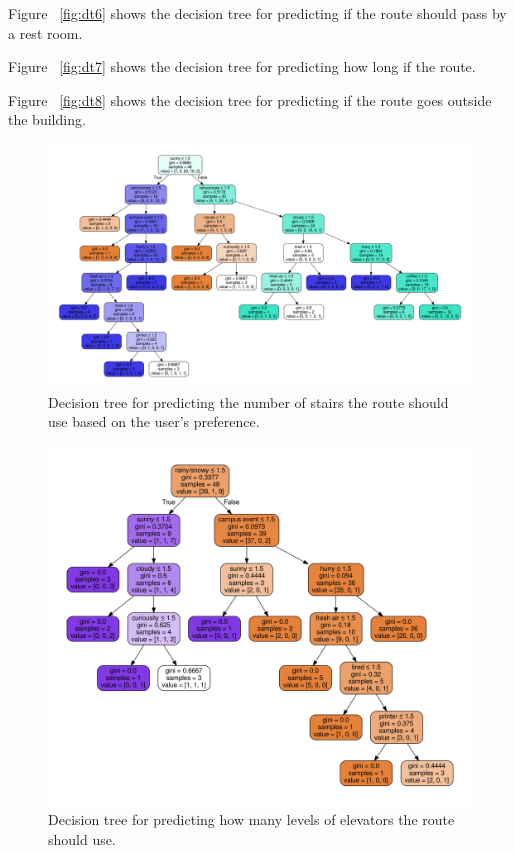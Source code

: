 \documentclass{sigchi}
\begin{document}
Figure ~\ref{fig:dt6} shows the decision tree for predicting if the route should pass by a rest room.


Figure ~\ref{fig:dt7} shows the decision tree for predicting how long if the route.


Figure ~\ref{fig:dt8} shows the decision tree for predicting if the route goes outside the building.

\begin{figure}[!h]
\centering
\includegraphics[width=1.0\columnwidth]{pics/decisionTree_1.png}
\caption{Decision tree for predicting the number of stairs the route should use based on the user’s preference.}
\label{fig:dt1}
\end{figure}

\begin{figure}[!h]
\centering
\includegraphics[width=1.0\columnwidth]{pics/decisionTree_2.png}
\caption{Decision tree for predicting how many levels of elevators the route should use.}
\label{fig:dt2}
\end{figure}
\end{document}
